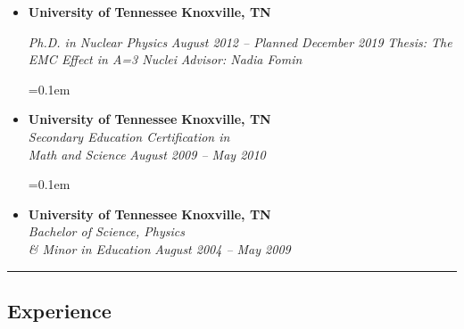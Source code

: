 \begin{itemize}
\parskip=0.1em

\item 
\headerrow
{\textbf{University of Tennessee}}
{\textbf{Knoxville, TN}}

\headerrow
{\emph{Ph.D. in Nuclear Physics}}
{\emph{August 2012 -- Planned December 2019}}
\headerrow
{\emph{Thesis: The EMC Effect in A=3 Nuclei}}
{\emph{Advisor: Nadia Fomin}}


\parskip=0.1em

\item 
\headerrow
{\textbf{University of Tennessee}}
{\textbf{Knoxville, TN}}
\\
\headerrow
{\emph{Secondary Education Certification in}\\\emph{ Math and Science}}
{\emph{August 2009 -- May 2010}}


\parskip=0.1em

\item 
\headerrow
{\textbf{University of Tennessee}}
{\textbf{Knoxville, TN}}
\\
\headerrow
{\emph{Bachelor of Science, Physics}\\ \emph{ \& Minor in Education }}
{\emph{August 2004 -- May 2009}}


\end{itemize}
\hrule
\vspace{-0.4em}
\subsection*{Experience}


